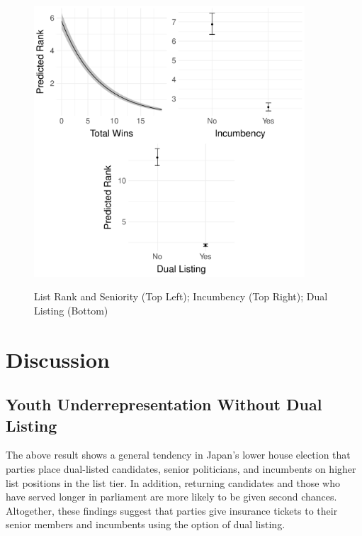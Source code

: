 \documentclass[a4paper, 11pt]{article}
\begin{document}
\begin{figure}[!thb]
	\caption{List Rank and Seniority (Top Left); Incumbency (Top Right); Dual Listing (Bottom)}
	\includegraphics[width = 0.9\textwidth]{../figure/paper/h1_h2_h3.pdf}
	\label{fig:rank}
\end{figure}

\section{Discussion} \label{sec: dis}

\subsection{Youth Underrepresentation Without Dual Listing}

The above result shows a general tendency in Japan's lower house election that parties place dual-listed candidates, senior politicians, and incumbents on higher list positions in the list tier. In addition, returning candidates and those who have served longer in parliament are more likely to be given second chances. Altogether, these findings suggest that parties give insurance tickets to their senior members and incumbents using the option of dual listing. 
\end{document}
